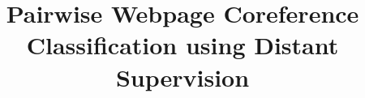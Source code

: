 \documentclass{sig-alternate-05-2015}
\begin{document}






%

\title{Pairwise Webpage Coreference Classification using Distant Supervision}
%
%
%
%
%
\end{document}

